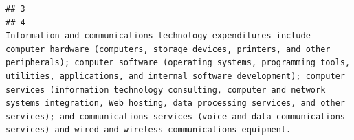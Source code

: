 \documentclass[
]{article}
\begin{document}
\begin{verbatim}
## 3                                                                                                                                                                                                                                                                                                                                                                                                                                                                                                                                                                                                                                                                                                                                                                                                                                                                                                                                                                                                                                                                                                                                                                                                                                                                                                                                                                                                                                                   
## 4                                                                                                                                                                                                                                                                                                                                                                                                                                                                                                                                                                                                                                                                                                                                                                                                                                                                                            Information and communications technology expenditures include computer hardware (computers, storage devices, printers, and other peripherals); computer software (operating systems, programming tools, utilities, applications, and internal software development); computer services (information technology consulting, computer and network systems integration, Web hosting, data processing services, and other services); and communications services (voice and data communications services) and wired and wireless communications equipment.

\end{verbatim}
\end{document}
